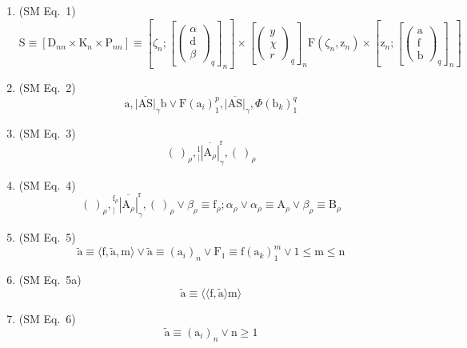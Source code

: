 \documentclass[12pt]{article}
\begin{document}
\begin{enumerate}[label=(\arabic*), series=formellist]
    \item (SM Eq.\ 1) 
    \[
    \mathrm{S} \equiv [\mathrm{D}_{nn} \times \mathrm{K}_n \times \mathrm{P}_{nn}] \equiv \left[ \zeta_n; \left[ \begin{pmatrix} \alpha \\ \mathrm{d} \\ \beta \end{pmatrix}_q \right]_n \right] \times \left[ \begin{pmatrix} y \\ \chi \\ r \end{pmatrix}_q \right]_n \mathrm{F}(\zeta_n, \mathrm{z}_n) \times \left[ \mathrm{z}_n; \left[ \begin{pmatrix} \mathrm{a} \\ \mathrm{f} \\ \mathrm{b} \end{pmatrix}_q \right]_n \right]
    \]

    \item (SM Eq.\ 2) 
    \[
    \mathrm{a}, \overline{|\mathrm{AS}|}_\gamma \mathrm{b} \lor \mathrm{F}(\mathrm{a}_i)_1^p, \overline{|\mathrm{AS}|}_\gamma, \Phi(\mathrm{b}_k)_1^q
    \]

    \item (SM Eq.\ 3) 
    \[
    (\ )_\rho, \left. {}^{\mathrm{l}}_{|} \overline{|\mathrm{A}_\rho|} \right.^{\mathrm{r}}_\gamma, (\ )_\rho
    \]

    \item (SM Eq.\ 4) 
    \[
    (\ )_\rho, \left. {}^{\mathrm{f}_\rho}_{|} \overline{|\mathrm{A}_\rho|} \right.^{\mathrm{r}}_\gamma, (\ )_\rho \lor \beta_\rho \equiv \mathrm{f}_\rho; \alpha_\rho \lor \alpha_\rho \equiv \mathrm{A}_\rho \lor \beta_\rho \equiv \mathrm{B}_\rho
    \]

    \item (SM Eq.\ 5) 
    \[
    \tilde{\mathrm{a}} \equiv \langle \mathrm{f}, \tilde{\mathrm{a}}, \mathrm{m} \rangle \lor \tilde{\mathrm{a}} \equiv (\mathrm{a}_i)_n \lor \mathrm{F}_1 \equiv \mathrm{f}(\mathrm{a}_k)_1^m \lor 1 \le \mathrm{m} \le \mathrm{n}
    \]

    \item (SM Eq.\ 5a) 
    \[
    \tilde{\mathrm{a}} \equiv \langle\langle \mathrm{f}, \tilde{\mathrm{a}} \rangle \mathrm{m} \rangle
    \]

    \item (SM Eq.\ 6) 
    \[
    \tilde{\mathrm{a}} \equiv (\mathrm{a}_i)_n \lor \mathrm{n} \ge 1
    \]


\end{enumerate}
\end{document}
